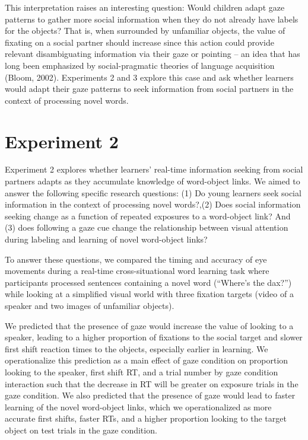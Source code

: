 \documentclass[10pt, letterpaper]{article}
\begin{document}
This interpretation raises an interesting question: Would children adapt
gaze patterns to gather more social information when they do not already
have labels for the objects? That is, when surrounded by unfamiliar
objects, the value of fixating on a social partner should increase since
this action could provide relevant disambiguating information via their
gaze or pointing -- an idea that has long been emphasized by
social-pragmatic theories of language acquisition (Bloom, 2002).
Experiments 2 and 3 explore this case and ask whether learners would
adapt their gaze patterns to seek information from social partners in
the context of processing novel words.

\hypertarget{experiment-2}{%
\section{Experiment 2}\label{experiment-2}}

Experiment 2 explores whether learners' real-time information seeking
from social partners adapts as they accumulate knowledge of word-object
links. We aimed to answer the following specific research questions: (1)
Do young learners seek social information in the context of processing
novel words?,(2) Does social information seeking change as a function of
repeated exposures to a word-object link? And (3) does following a gaze
cue change the relationship between visual attention during labeling and
learning of novel word-object links?

To answer these questions, we compared the timing and accuracy of eye
movements during a real-time cross-situational word learning task where
participants processed sentences containing a novel word (``Where's the
dax?'') while looking at a simplified visual world with three fixation
targets (video of a speaker and two images of unfamiliar objects).

We predicted that the presence of gaze would increase the value of
looking to a speaker, leading to a higher proportion of fixations to the
social target and slower first shift reaction times to the objects,
especially earlier in learning. We operationalize this prediction as a
main effect of gaze condition on proportion looking to the speaker,
first shift RT, and a trial number by gaze condition interaction such
that the decrease in RT will be greater on exposure trials in the gaze
condition. We also predicted that the presence of gaze would lead to
faster learning of the novel word-object links, which we operationalized
as more accurate first shifts, faster RTs, and a higher proportion
looking to the target object on test trials in the gaze condition.
\end{document}
